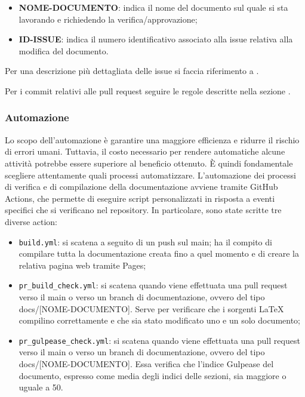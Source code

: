 \begin{itemize}
      \item \textbf{NOME-DOCUMENTO}: indica il nome del documento sul quale si sta lavorando e richiedendo la verifica/approvazione;
      \item \textbf{ID-ISSUE}: indica il numero identificativo associato alla issue relativa alla modifica del documento.
\end{itemize}

Per una descrizione più dettagliata delle issue si faccia riferimento a
.

Per i commit relativi alle pull request seguire le regole descritte nella
sezione .

\subsubsection{Automazione}\label{inf:automaz}
Lo scopo dell'automazione è garantire una maggiore efficienza e ridurre il
rischio di errori umani. Tuttavia, il costo necessario per rendere automatiche
alcune attività potrebbe essere superiore al beneficio ottenuto. È quindi
fondamentale scegliere attentamente quali processi automatizzare.
L'automazione dei processi di verifica e di compilazione della documentazione
avviene tramite GitHub Actions, che permette di eseguire script personalizzati
in risposta a eventi specifici che si verificano nel repository. In
particolare, sono state scritte tre diverse action:
\begin{itemize}
      \item \texttt{build.yml}: si scatena a seguito di un push sul main; ha il compito di compilare
            tutta la documentazione creata fino a quel momento e di creare la relativa pagina web tramite Pages;
      \item \texttt{pr\_build\_check.yml}: si scatena quando viene effettuata una pull request verso il main o verso
            un branch di documentazione, ovvero del tipo docs/[NOME-DOCUMENTO]. Serve per verificare che
            i sorgenti LaTeX compilino correttamente e che sia stato modificato uno e un solo documento;
      \item \texttt{pr\_gulpease\_check.yml}: si scatena quando viene effettuata una pull request verso il main o verso
            un branch di documentazione, ovvero del tipo docs/[NOME-DOCUMENTO]. Essa verifica che
            l'indice Gulpease del documento, espresso come media degli indici delle sezioni, sia maggiore o uguale a 50.
\end{itemize}

